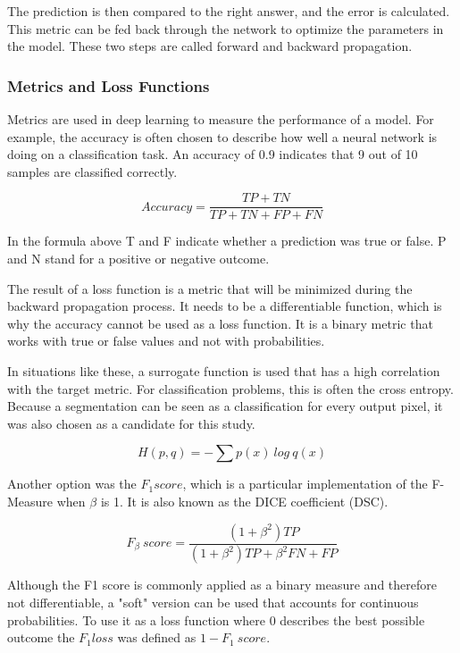 The prediction is then compared to the right answer, and the error is calculated. This metric can be fed back through the network to optimize the parameters in the model. These two steps are called forward and backward propagation.

\subsubsection{Metrics and Loss Functions}

Metrics are used in deep learning to measure the performance of a model. For example, the accuracy is often chosen to describe how well a neural network is doing on a classification task. An accuracy of 0.9 indicates that 9 out of 10 samples are classified correctly.

\begin{equation}
Accuracy = \frac{TP+TN}{TP+TN+FP+FN}
\end{equation}

In the formula above T and F indicate whether a prediction was true or false. P and N stand for a positive or negative outcome.

The result of a loss function is a metric that will be minimized during the backward propagation process. It needs to be a differentiable function, which is why the accuracy cannot be used as a loss function. It is a binary metric that works with true or false values and not with probabilities.

In situations like these, a surrogate function is used that has a high correlation with the target metric. For classification problems, this is often the cross entropy. Because a segmentation can be seen as a classification for every output pixel, it was also chosen as a candidate for this study.

\begin{equation}
H(p, q) = -\sum p(x) \ log \ q(x)
\end{equation}

Another option was the $F_1 score$, which is a particular implementation of the F-Measure when $ \beta $ is 1. It is also known as the DICE coefficient (DSC).

\begin{equation}
F_\beta \ score= \frac{(1 + \beta^2) TP}{(1+\beta^2)TP+\beta^2FN+FP}
\end{equation}

Although the F1 score is commonly applied as a binary measure and therefore not differentiable, a "soft" version can be used that accounts for continuous probabilities. To use it as a loss function where 0 describes the best possible outcome the $F_1 loss$ was defined as $ 1 - F_1 \ score $.

